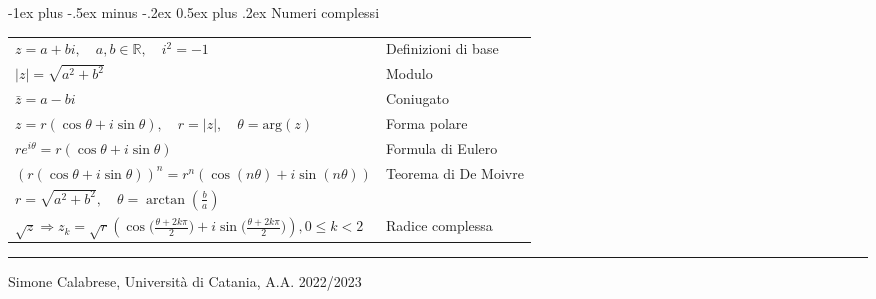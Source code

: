 \documentclass[a4paper,10pt,landscape]{article}
\makeatletter
\renewcommand{\section}{\@startsection{section}{1}{0mm}%
                                {-1ex plus -.5ex minus -.2ex}%
                                {0.5ex plus .2ex}%
                                {\normalfont\large\bfseries}}
\makeatother
\begin{document}
\begin{multicols}{3}
\section{\hspace{.8cm} Numeri complessi} 
\vspace{1mm}
\hspace{.8cm}
\begin{tabular}{l l}
    $ z = a + bi, \quad a, b \in \mathbb{R}, \quad i^2 = -1 $ & Definizioni di base \\
    $ |z| = \sqrt{a^2 + b^2} $ & Modulo \\
    $ \bar{z} = a - bi $ & Coniugato \\
    $ z = r(\cos \theta + i \sin \theta), \quad r = |z|, \quad \theta = \text{arg}(z) $ & Forma polare \\
    $ re^{i\theta} = r(\cos \theta + i \sin \theta) $ &   Formula di Eulero \\
    $ (r(\cos \theta + i \sin \theta))^n = r^n (\cos (n\theta) + i \sin (n\theta))$ & Teorema di De Moivre \\
    $ r = \sqrt{a^2 + b^2}, \quad \theta = \arctan\left(\frac{b}{a}\right) $ \\
    $ \sqrt{z} \Rightarrow z_k = \sqrt{r}(\cos \big(\frac{\theta + 2k\pi}{2}\big) + i \sin \big(\frac{\theta + 2k\pi}{2}\big) ), 0\le k<2  $ & Radice complessa\\
\end{tabular}


\vspace{3mm}
\hrule
\smallskip
\noindent Simone Calabrese, Università di Catania, A.A. 2022/2023 \hfill  \href{http://simonecalabrese.com/}{\color{blue}{simonecalabrese.com}}\\

\end{multicols}
\end{document}
